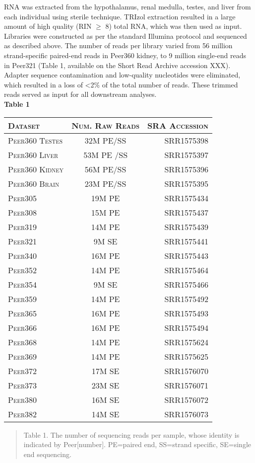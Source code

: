 \documentclass[11pt]{article}
\begin{document}
RNA was extracted from the hypothalamus, renal medulla, testes, and liver from each individual using sterile technique. TRIzol extraction resulted in a large amount of high quality (RIN $\geq$ 8) total RNA, which was then used as input. Libraries were constructed as per the standard Illumina protocol and sequenced as described above. The number of reads per library varied from 56 million strand-specific paired-end reads in Peer360 kidney, to 9 million single-end reads in Peer321 (\hypertarget{Table 1}{Table 1}, available on the Short Read Archive accession XXX). Adapter sequence contamination and low-quality nucleotides were eliminated, which resulted in a loss of \textless 2\% of the total number of reads. These trimmed reads served as input for all downstream analyses. \\
\textbf{\hypertarget{Table 1}{Table 1}} \\
\begin{center}
\begin{tabular}{l|c | r}
\textsc{Dataset}& \textsc{Num. Raw Reads} & \textsc{SRA Accession} \\
\hline 
\textsc{Peer360 Testes} & 32M PE/SS  & SRR1575398 \\
\textsc{Peer360 Liver} & 53M PE /SS & SRR1575397 \\
\textsc{Peer360 Kidney} & 56M PE/SS  & SRR1575396 \\
\textsc{Peer360 Brain}  & 23M PE/SS & SRR1575395\\
\textsc{Peer305}  & 19M PE  & SRR1575434  \\
\textsc{Peer308}  & 15M PE  & SRR1575437 \\
\textsc{Peer319}  & 14M PE  & SRR1575439\\
\textsc{Peer321}  & 9M SE  & SRR1575441 \\
\textsc{Peer340}  & 16M PE  & SRR1575443 \\
\textsc{Peer352}  & 14M PE  & SRR1575464 \\
\textsc{Peer354}  & 9M SE  & SRR1575466 \\
\textsc{Peer359}  & 14M PE  & SRR1575492 \\
\textsc{Peer365}  & 16M PE & SRR1575493 \\
\textsc{Peer366}  & 16M PE & SRR1575494 \\
\textsc{Peer368}  & 14M PE  & SRR1575624\\
\textsc{Peer369}  & 14M PE  & SRR1575625\\
\textsc{Peer372}  & 17M SE  & SRR1576070\\
\textsc{Peer373}  & 23M SE  & SRR1576071\\
\textsc{Peer380}  & 16M SE  & SRR1576072 \\
\textsc{Peer382}  & 14M SE  & SRR1576073 \\
\end{tabular}
\begin{quote}
\small{Table 1. The number of sequencing reads per sample, whose identity is indicated by Peer[number]. PE=paired end, SS=strand specific, SE=single end sequencing. }
\end{quote}
\end{center}
\end{document}
